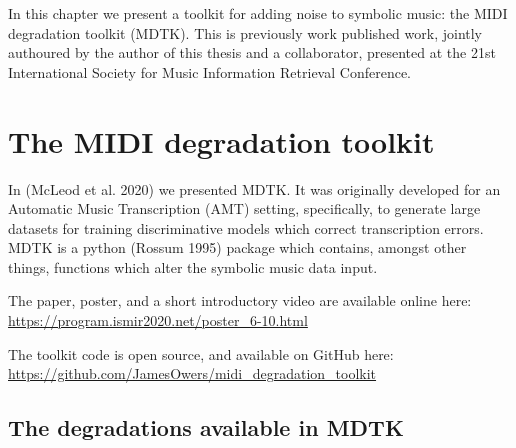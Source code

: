 \documentclass[12pt,a4paper,]{report}
\begin{document}
In this chapter we present a toolkit for adding noise to symbolic music:
the MIDI degradation toolkit (MDTK). This is previously work published
work, jointly authoured by the author of this thesis and a collaborator,
presented at the 21st International Society for Music Information
Retrieval Conference.

\hypertarget{the-midi-degradation-toolkit}{%
\section{The MIDI degradation
toolkit}\label{the-midi-degradation-toolkit}}

In (McLeod et al. 2020) we presented MDTK. It was originally developed
for an Automatic Music Transcription (AMT) setting, specifically, to
generate large datasets for training discriminative models which correct
transcription errors. MDTK is a python (Rossum 1995) package which
contains, amongst other things, functions which alter the symbolic music
data input.

The paper, poster, and a short introductory video are available online
here: \url{https://program.ismir2020.net/poster_6-10.html}

The toolkit code is open source, and available on GitHub here:
\url{https://github.com/JamesOwers/midi_degradation_toolkit}

\hypertarget{the-degradations-available-in-mdtk}{%
\subsection{The degradations available in
MDTK}\label{the-degradations-available-in-mdtk}}

\end{document}
